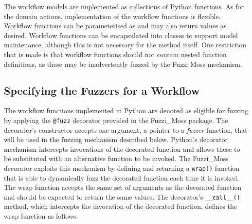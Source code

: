 \documentclass{sig-alternate}
\begin{document}
The workflow models are implemented as collections of Python functions.  As for
the domain actions, implementation of the workflow functions is
flexible. Workflow functions can be parameterised as and may also return values
as desired.  Workflow functions can be encapsulated into classes to support
model maintenance, although this is not necessary for the method itself.  One
restriction that is made is that workflow functions should not contain nested
function definitions, as these may be inadvertently fuzzed by the Fuzzi Moss
mechanism.


\subsection{Specifying the Fuzzers for a Workflow}


The workflow functions implemented in Python are denoted as eligible for fuzzing
by applying the \lstinline!@fuzz! decorator provided in the Fuzzi\_Moss
package. The decorator's constructor accepts one argument, a pointer to a
\emph{fuzzer} function, that will be used in the fuzzing mechanism described
below.  Python's decorator mechanism intercepts invocations of the decorated
function and allows these to be substituted with an alternative function to be
invoked.  The Fuzzi\_Moss decorator exploits this mechanism by defining and
returning a \lstinline!wrap()!  function that is able to dynamically fuzz the
decorated function each time it is invoked.  The wrap function accepts the same
set of arguments as the decorated function and should be expected to return the
same values. The decorator's \lstinline!__call__()!  method, which intercepts
the invocation of the decorated function, defines the wrap function as follows.
\end{document}
